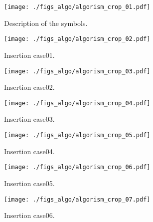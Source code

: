 \begin{figure}[h]
  \vspace{-0.5cm}
  \texttt{[image: ./figs\_algo/algorism\_crop\_01.pdf]}
  \caption{
    Description of the symbols.
  }
  \label{fig_IpCHashT_fig_description}
  \vspace{-0.5cm}
\end{figure}

\begin{figure}[h]
  \vspace{-0.5cm}
  \texttt{[image: ./figs\_algo/algorism\_crop\_02.pdf]}
  \caption{
    Insertion case01.
  }
  \label{fig_IpCHashT_insert_hard_case01}
  \vspace{-0.5cm}
\end{figure}

\begin{figure}[h]
  \vspace{-0.5cm}
  \texttt{[image: ./figs\_algo/algorism\_crop\_03.pdf]}
  \caption{
    Insertion case02.
  }
  \label{fig_IpCHashT_insert_hard_case02}
  \vspace{-0.5cm}
\end{figure}

\begin{figure}[h]
  \vspace{-0.5cm}
  \texttt{[image: ./figs\_algo/algorism\_crop\_04.pdf]}
  \caption{
    Insertion case03.
  }
  \label{fig_IpCHashT_insert_hard_case03}
  \vspace{-0.5cm}
\end{figure}

\begin{figure}[h]
  \vspace{-0.5cm}
  \texttt{[image: ./figs\_algo/algorism\_crop\_05.pdf]}
  \caption{
    Insertion case04.
  }
  \label{fig_IpCHashT_insert_hard_case04}
  \vspace{-0.5cm}
\end{figure}

\begin{figure}[h]
  \vspace{-0.5cm}
  \texttt{[image: ./figs\_algo/algorism\_crop\_06.pdf]}
  \caption{
    Insertion case05.
  }
  \label{fig_IpCHashT_insert_hard_case06}
  \vspace{-0.5cm}
\end{figure}

\begin{figure}[h]
  \vspace{-0.5cm}
  \texttt{[image: ./figs\_algo/algorism\_crop\_07.pdf]}
  \caption{
    Insertion case06.
  }
  \label{fig_IpCHashT_insert_hard_case11}
  \vspace{-0.5cm}
\end{figure}

